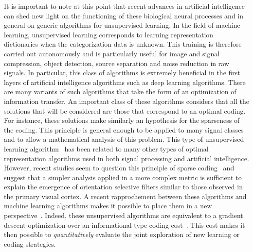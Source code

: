 \documentclass[a4paper, 11pt, draft]{article} %
\begin{document}
It is important to note at this point that recent advances in artificial intelligence can shed new light on the functioning of these biological neural processes and in general on generic algorithms for unsupervised learning. In the field of machine learning, unsupervised learning corresponds to learning representation dictionaries when the categorization data is unknown. This training is therefore carried out autonomously and is particularly useful for image and signal compression, object detection, source separation and noise reduction in raw signals. In particular, this class of algorithms is extremely beneficial in the first layers of artificial intelligence algorithms such as deep learning algorithms. There are many variants of such algorithms that take the form of an optimization of information transfer. An important class of these algorithms considers that all the solutions that will be considered are those that correspond to an optimal coding. For instance, these solutions make similarly an hypothesis for the sparseness of the coding. This principle is general enough to be applied to many signal classes and to allow a mathematical analysis of this problem. %
This type of unsupervised learning algorithm~\citep{Olshausen97} has been related to many other types of optimal representation algorithms used in both signal processing and artificial intelligence. %
However, recent studies seem to question this principle of sparse coding~\citep{Eichhorn09,Zoran12} and suggest that a simpler analysis applied in a more complex metric is sufficient to explain the emergence of orientation selective filters similar to those observed in the primary visual cortex. %
A recent rapprochement between these algorithms and machine learning algorithms makes it possible to place them in a new perspective~\citep{Elad10}. Indeed, these unsupervised algorithms are equivalent to a gradient descent optimization over an informational-type coding cost~\citep{Kingma13}. This cost makes it then possible to \emph{quantitatively} evaluate the joint exploration of new learning or coding strategies. %
\end{document}
